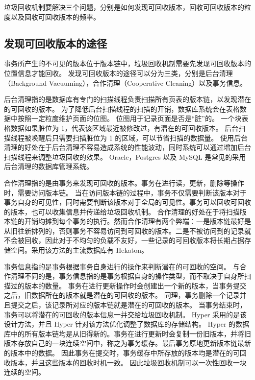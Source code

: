 垃圾回收机制要解决三个问题，分别是如何发现可回收版本，回收可回收版本的粒度以及回收可回收版本的频率。

\subsection{发现可回收版本的途径}

事务所产生的不可见的版本位于版本链中，垃圾回收机制需要先发现可回收版本的位置信息才能回收。
发现可回收版本的途径可以分为三类，分别是后台清理（Background Vacuuming），合作清理（Cooperative Cleaning）以及事务信息。

后台清理指的是数据库有专门的扫描线程负责扫描所有页表的版本链，以发现潜在的可回收的版本。
为了降低后台扫描线程的扫描的开销，数据库系统会在表格数据中按照一定粒度维护页面的位图。
位图用于记录页面是否是“脏”的。
一个块表格数据如果脏位为 1，代表该区域最近被修改过，有潜在的可回收版本。
后台扫描线程被唤醒后只需要扫描脏位为 1 的区域，可以节省扫描的数据量。
使用后台清理的好处在于后台清理不容易造成系统的性能波动，同时系统可以通过增加后台扫描线程来调整垃圾回收的效果。
Oracle\cite{oracle}，Postgres\cite{pg} 以及 MySQL\cite{mysql} 是常见的采用后台清理的数据库管理系统。

合作清理指的是由事务来发现可回收的版本。事务在进行读，更新，删除等操作时，需要访问版本链。
当在访问版本链的过程中，事务不仅需要判断该版本对于事务自身的可见性，同时需要判断该版本对于全局的可见性。事务可以回收可回收的版本，也可以收集信息并传递给垃圾回收机制。
合作清理的好处在于将扫描版本链的开销均摊到每个事务的执行。然而合作清理有两个弊端：一是版本链最好是从旧往新排列的，否则事务不容易访问到可回收的版本。二是不被访问到的记录就不会被回收，因此对于不均匀的负载不友好，一些记录的可回收版本将长期占据存储空间。采用该方法的主流数据库有 Hekaton\cite{hekaton}。

事务信息指的是事务根据事务自身进行的操作来判断潜在的可回收的空间。
与合作清理不同的是，事务信息指的是事务根据自身的操作类型，而不取决于自身所扫描过的版本的数量。
事务在进行更新操作时会创建出一个新的版本，当事务提交之后，旧数据所在的版本就是潜在的可回收的版本。
同理，事务删除一个记录并且提交之后，该记录所对应的版本链就是潜在的可回收的版本。
当事务结束时，事务可以将潜在的可回收的版本信息一并交给垃圾回收机制。
Hyper\cite{hyper} 采用的是该设计方法，并且 Hyper 针对该方法优化调整了数据库的存储结构。
Hyper 的数据库中的所有版本链均是从旧得新的。事务在进行更新时会复制一份旧版本，并将旧版本存放自己的一块连续空间中，称之为事务缓存。最后事务原地更新版本链最新的版本中的数据。
因此事务在提交时，事务缓存中所存放的版本均是潜在的可回收版本，并且这些版本的回收时机一致。
因此垃圾回收机制可以一次性回收一块连续的空间。


